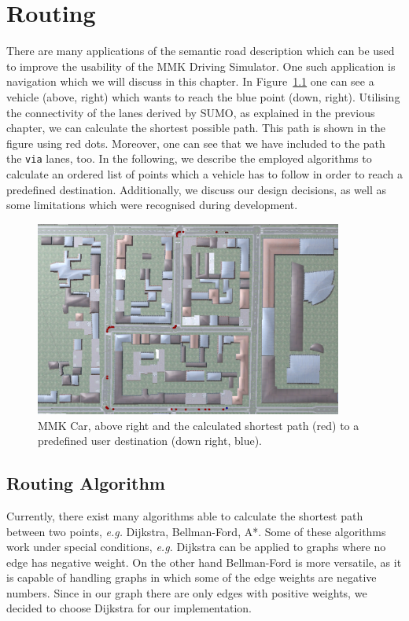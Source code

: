 \chapter{Routing}
\label{ch:gps}

There are many applications of the semantic road description which can be used to improve the usability of the MMK Driving Simulator. One such application is navigation which we will discuss in this chapter. In Figure~\ref{fig:nav} one can see a vehicle (above, right) which wants to reach the blue point (down, right). Utilising the connectivity of the lanes derived by SUMO, as explained in the previous chapter, we can calculate the shortest possible path. This path is shown in the figure using red dots. Moreover, one can see that we have included to the path the \texttt{via} lanes, too. In the following, we describe the employed algorithms to calculate an ordered list of points which a vehicle has to follow in order to reach a predefined destination. Additionally, we discuss our design decisions, as well as some limitations which were recognised during development.

\begin{figure}[htb]
	\centering
	\includegraphics[width=0.9\textwidth]{figures/nav}
	\caption{MMK Car, above right and the calculated shortest path (red) to a predefined user destination (down right, blue).}
	\label{fig:nav}
\end{figure}
\section{Routing Algorithm}
Currently, there exist many algorithms able to calculate the shortest path between two points, \emph{e.g.} Dijkstra, Bellman-Ford, A*. Some of these algorithms work under special conditions, \emph{e.g.} Dijkstra can be applied to graphs where no edge has negative weight. On the other hand Bellman-Ford is more versatile, as it is capable of handling graphs in which some of the edge weights are negative numbers. Since in our graph there are only edges with positive weights, we decided to choose Dijkstra for our implementation.


